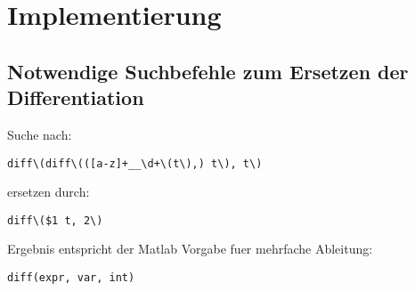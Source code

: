 \chapter{Implementierung}\label{ch:implement}

\section{Notwendige Suchbefehle zum Ersetzen der Differentiation}
Suche nach: \begin{lstlisting}
diff\(diff\(([a-z]+__\d+\(t\),) t\), t\)
\end{lstlisting} 

ersetzen durch: 
\begin{lstlisting} 
diff\($1 t, 2\)
\end{lstlisting} 

Ergebnis entspricht der Matlab Vorgabe fuer mehrfache Ableitung: 
\begin{lstlisting}
diff(expr, var, int)
\end{lstlisting}